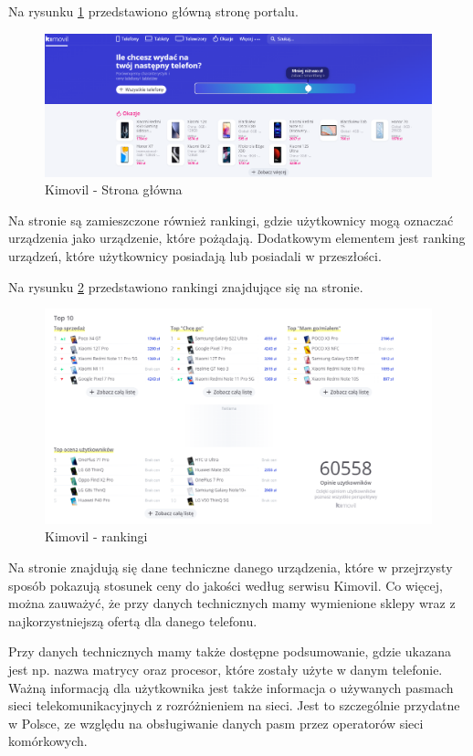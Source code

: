 Na rysunku \ref*{kimovil_1} przedstawiono główną stronę portalu.
\begin{figure}[H]
    \centering
    \includegraphics[scale=0.36]{img/Kimovil/kimovil.png}
    \caption{Kimovil - Strona główna}
    \label{kimovil_1}
\end{figure}
Na stronie są zamieszczone również rankingi, gdzie użytkownicy mogą oznaczać urządzenia jako urządzenie, które pożądają. Dodatkowym elementem jest ranking urządzeń, które użytkownicy posiadają lub posiadali w przeszłości.

Na rysunku \ref*{kimovil_2} przedstawiono rankingi znajdujące się na stronie.
\begin{figure}[H]
    \centering
    \includegraphics[scale=0.448]{img/Kimovil/rankingsKimovil.png}
    \caption{Kimovil - rankingi}
    \label{kimovil_2}
\end{figure}
Na stronie znajdują się dane techniczne danego urządzenia, które w przejrzysty sposób pokazują stosunek ceny do jakości według serwisu Kimovil. Co więcej, można zauważyć, że przy danych technicznych mamy wymienione sklepy wraz z najkorzystniejszą ofertą dla danego telefonu. 

Przy danych technicznych mamy także dostępne podsumowanie, gdzie ukazana jest np. nazwa matrycy oraz procesor, które zostały użyte w danym telefonie. Ważną informacją dla użytkownika jest także informacja o używanych pasmach sieci telekomunikacyjnych z rozróżnieniem na sieci. Jest to szczególnie przydatne w Polsce, ze względu na obsługiwanie danych pasm przez operatorów sieci komórkowych.

